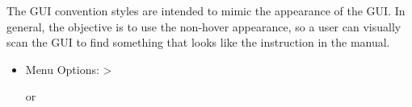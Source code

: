 
The GUI convention styles are intended to mimic the appearance of the GUI. In
general, the objective is to use the non-hover appearance, so a user can
visually scan the GUI to find something that looks like the instruction
in the manual.

\begin{itemize}
%
\item Menu Options:  > %
%

or


\end{itemize}
